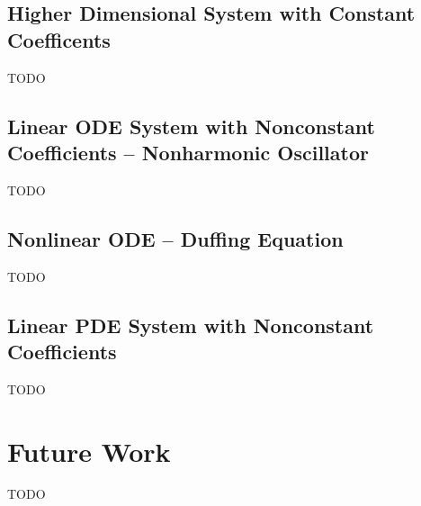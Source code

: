 \documentclass{article}
\begin{document}
\subsection{Higher Dimensional System with Constant Coefficents} \label{section:high-dimension}
TODO

\subsection{Linear ODE System with Nonconstant Coefficients -- Nonharmonic Oscillator} \label{section:experiment-nonharmonic-oscillator}
TODO

\subsection{Nonlinear ODE -- Duffing Equation} \label{section:experiment-duffing}
TODO

\subsection{Linear PDE System with Nonconstant Coefficients } \label{section:experiment-attractor}
TODO

\section{Future Work}
TODO
\end{document}
